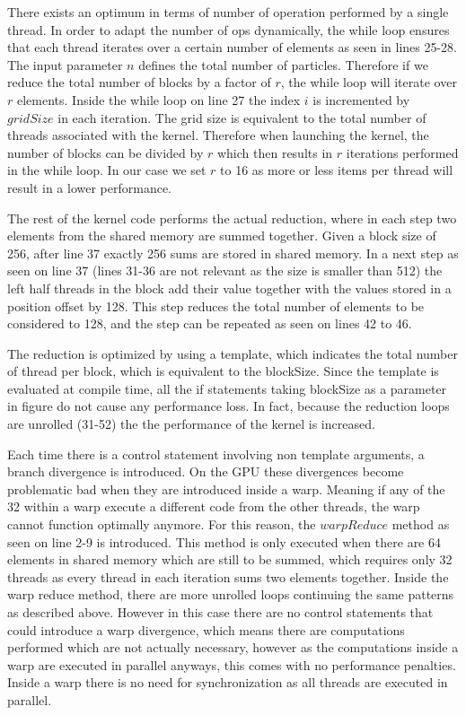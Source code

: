 \documentclass[]{article}
\begin{document}
There exists an optimum in terms of number of operation performed by a single thread. In order to adapt the number of ops dynamically, the while loop ensures that each thread iterates over a certain number of elements as seen in lines 25-28. The input parameter $n$ defines the total number of particles. Therefore if we reduce the total number of blocks by a factor of $r$, the while loop will iterate over $r$ elements. Inside the while loop on line 27 the index $i$ is incremented by $gridSize$ in each iteration. The grid size is equivalent to the total number of threads associated with the kernel. Therefore when launching the kernel, the number of blocks can be divided by $r$ which then results in $r$ iterations performed in the while loop. In our case we set $r$ to 16 as more or less items per thread will result in a lower performance.

The rest of the kernel code performs the actual reduction, where in each step two elements from the shared memory are summed together. Given a block size of 256, after line 37 exactly 256 sums are stored in shared memory. In a next step as seen on line 37 (lines 31-36 are not relevant as the size is smaller than 512) the left half threads in the block add their value together with the values stored in a position offset by 128. This step reduces the total number of elements to be considered to 128, and the step can be repeated as seen on lines 42 to 46. 

The reduction is optimized by using a template, which indicates the total number of thread per block, which is equivalent to the blockSize. Since the template is evaluated at compile time, all the if statements taking blockSize as a parameter in figure do not cause any performance loss. In fact, because  the reduction loops are unrolled (31-52) the the performance of the kernel is increased. 

Each time there is a control statement involving non template arguments, a branch divergence is introduced. On the GPU these divergences become problematic bad when they are introduced inside a warp. Meaning if any of the 32 within a warp execute a different code from the other threads, the warp cannot function optimally anymore. For this reason, the $warpReduce$ method as seen on line 2-9 is introduced. This method is only executed when there are 64 elements in shared memory which are still to be summed, which requires only 32 threads as every thread in each iteration sums two elements together. Inside the warp reduce method, there are more unrolled loops continuing the same patterns as described above. However in this case there are no control statements that could introduce a warp divergence, which means there are computations performed which are not actually necessary, however as the computations inside a warp are executed in parallel anyways, this comes with no performance penalties. Inside a warp there is no need for synchronization as all threads are executed in parallel. 
\end{document}
